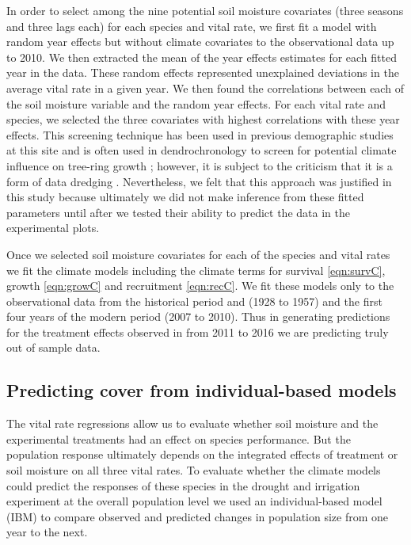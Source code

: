 \documentclass[11pt]{article}
\begin{document}
\begin{doublespacing}
In order to select among the nine potential soil moisture covariates (three seasons and three lags each) for each species and vital rate, we first fit a model with random year effects but without climate covariates to the observational data up to 2010. We then extracted the mean of the year effects estimates for each fitted year in the data. These random effects represented unexplained deviations in the average vital rate in a given year.  We then found the correlations between each of the soil moisture variable and the random year effects. For each vital rate and species, we selected the three covariates with highest correlations with these year effects. This screening technique has been used in previous demographic studies at this site \citep{dalgleish_climate_2010} and is often used in dendrochronology to screen for potential climate influence on tree-ring growth \citep{wang trees}; however, it is subject to the criticism that it is a form of data dredging \citep{dredging}.  Nevertheless, we felt that this approach was justified in this study because ultimately we did not make inference from these fitted parameters until after we tested their ability to predict the data in the experimental plots.  

Once we selected soil moisture covariates for each of the species and vital rates we fit the climate models including the climate terms for survival \ref{eqn:survC}, growth \ref{eqn:growC} and recruitment \ref{eqn:recC}.  We fit these models only to the observational data from the historical period and (1928 to 1957) and the first four years of the modern period (2007 to 2010).  Thus in generating predictions for the treatment effects observed in from 2011 to 2016 we are predicting truly out of sample data.

\subsection*{Predicting cover from individual-based models}

The vital rate regressions allow us to evaluate whether soil moisture and the experimental treatments had an effect on species performance.  But the population response ultimately depends on the integrated effects of treatment or soil moisture on all three vital rates.  To evaluate whether the climate models could predict the responses of these species in the drought and irrigation experiment at the overall population level we used an individual-based model (IBM) to compare observed and predicted changes in population size from one year to the next. 


\end{doublespacing}
\end{document}
